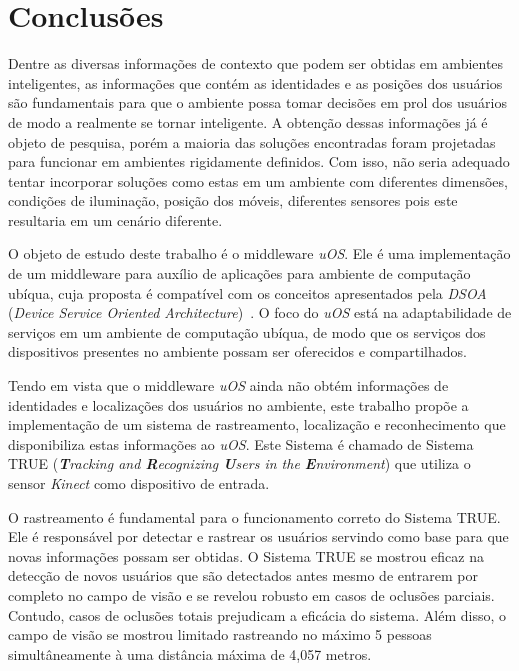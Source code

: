 \chapter{Conclusões}
\label{cap:conclusao}




Dentre as diversas informações de contexto que podem ser obtidas em ambientes
inteligentes, as informações que contém as identidades e as posições dos
usuários são fundamentais para que o ambiente possa tomar decisões em prol dos
usuários de modo a realmente se tornar inteligente. A obtenção dessas
informações já é objeto de pesquisa, porém a maioria das soluções encontradas
foram projetadas para funcionar em ambientes rigidamente definidos. Com isso,
não seria adequado tentar incorporar soluções como estas em um ambiente com
diferentes dimensões, condições de iluminação, posição dos móveis, diferentes
sensores pois este resultaria em um cenário diferente.

O objeto de estudo deste trabalho é o middleware \textit{uOS}. Ele é uma
implementação de um middleware para auxílio de aplicações para ambiente de
computação ubíqua, cuja proposta é compatível com os conceitos apresentados
pela \textit{DSOA} (\textit{Device Service Oriented
Architecture})~\cite{fabriciobuzzeto}. O foco do \textit{uOS} está na
adaptabilidade de serviços em um ambiente de computação ubíqua, de modo que os
serviços dos dispositivos presentes no ambiente possam ser oferecidos e
compartilhados.

Tendo em vista que o middleware \textit{uOS} ainda não obtém informações de identidades e localizações dos usuários no ambiente, este
trabalho propõe a implementação de um sistema de rastreamento, localização e reconhecimento que disponibiliza estas informações ao \textit{uOS}. Este Sistema é chamado de Sistema TRUE (\textit{\textbf{T}racking and \textbf{R}ecognizing \textbf{U}sers in the \textbf{E}nvironment}) que utiliza o sensor \textit{Kinect} como dispositivo de entrada.

O rastreamento é fundamental para o funcionamento correto do Sistema TRUE. Ele é responsável por detectar e rastrear os usuários servindo como base para que novas informações possam ser obtidas. O Sistema TRUE se mostrou eficaz na detecção de novos usuários que são detectados antes mesmo de entrarem por completo no campo de visão e se revelou robusto em casos de oclusões parciais. Contudo, casos de oclusões totais prejudicam a eficácia do sistema. Além disso, o campo de visão se mostrou limitado rastreando no máximo 5 pessoas simultâneamente à uma distância máxima de 4,057 metros.


